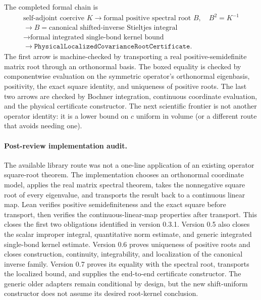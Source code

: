 \documentclass[11pt]{article}
\theoremstyle{definition}
\newcommand{\lean}[1]{\texttt{#1}}
\begin{document}
The completed formal chain is
\begin{equation}\label{eq:nextchain}
\boxed{
\begin{gathered}
\text{self-adjoint coercive }K
\longrightarrow \text{formal positive spectral root }B,\quad B^2=K^{-1}
\\
\longrightarrow \boxed{B=\text{canonical shifted-inverse Stieltjes integral}}
\\
\longrightarrow \text{formal integrated single-bond kernel bound}
\\
\longrightarrow
\lean{PhysicalLocalizedCovarianceRootCertificate}.
\end{gathered}}
\end{equation}
The first arrow is machine-checked by transporting a real positive-semidefinite
matrix root through an orthonormal basis.  The boxed equality is checked by
componentwise evaluation on the symmetric operator's orthonormal eigenbasis,
positivity, the exact square identity, and uniqueness of positive roots.  The
last two arrows are checked by Bochner integration, continuous coordinate
evaluation, and the physical certificate constructor.  The next scientific
frontier is not another operator identity: it is a lower bound on $c$ uniform
in volume (or a different route that avoids needing one).

\paragraph{Post-review implementation audit.}
The available library route was not a one-line application of an existing
operator square-root theorem.  The implementation chooses an orthonormal
coordinate model, applies the real matrix spectral theorem, takes the
nonnegative square root of every eigenvalue, and transports the result back to
a continuous linear map.  Lean verifies positive semidefiniteness and the
exact square before transport, then verifies the continuous-linear-map
properties after transport.  This closes the first two obligations identified
in version 0.3.1.  Version 0.5 also closes the scalar improper integral,
quantitative norm estimate, and generic integrated single-bond kernel
estimate.  Version 0.6 proves uniqueness of positive roots and closes
construction, continuity, integrability, and localization of the canonical
inverse family.  Version 0.7 proves its equality with the spectral root,
transports the localized bound, and supplies the end-to-end certificate
constructor.  The generic older adapters remain conditional by design, but
the new shift-uniform constructor does not assume its desired root-kernel
conclusion.
\end{document}
